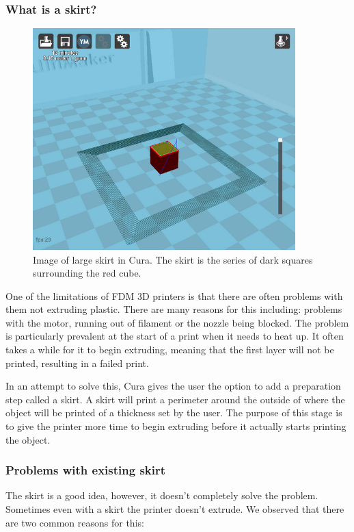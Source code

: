 \documentclass[11pt]{report} %
\begin{document}
\subsubsection{What is a skirt?}
\begin{figure}[H]
  \centering
  \includegraphics[width=4in]{WhatIsASkirt.png}
  \caption{Image of large skirt in Cura. The skirt is the series of dark squares surrounding the red cube.}
  \label{figure:WhatIsASkirt}
\end{figure}

One of the limitations of FDM 3D printers is that there are often problems with them not extruding plastic. There are many reasons for this including: problems with the motor, running out of filament or the nozzle being blocked. The problem is particularly prevalent at the start of a print when it needs to heat up. It often takes a while for it to begin extruding, meaning that the first layer will not be printed, resulting in a failed print.

In an attempt to solve this, Cura gives the user the option to add a preparation step called a skirt. A skirt will print a perimeter around the outside of where the object will be printed of a thickness set by the user. The purpose of this stage is to give the printer more time to begin extruding before it actually starts printing the object.

\subsubsection{Problems with existing skirt}
The skirt is a good idea, however, it doesn't completely solve the problem. Sometimes even with a skirt the printer doesn't extrude. We observed that there are two common reasons for this: 
\end{document}
